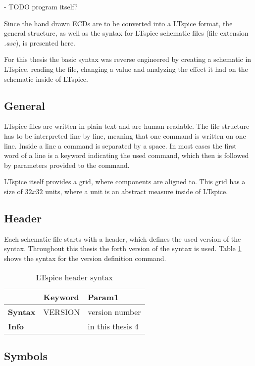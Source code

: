 - TODO program itself?

Since the hand drawn \ac{ECDs} are to be converted into a LTspice format, the general structure, as well as the syntax for LTspice schematic files (file extension \textit{.asc}), is presented here.

For this thesis the basic syntax was reverse engineered by creating a schematic in LTspice, reading the file, changing a value and analyzing the effect it had on the schematic inside of LTspice.

\subsection{General}
LTspice files are written in plain text and are human readable.
The file structure has to be interpreted line by line, meaning that one command is written on one line.
Inside a line a command is separated by a space.
In most cases the first word of a line is a keyword indicating the used command, which then is followed by parameters provided to the command.

LTspice itself provides a grid, where components are aligned to.
This grid has a size of $32x32$ units, where a unit is an abstract measure inside of LTspice.

\subsection{Header}

Each schematic file starts with a header, which defines the used version of the syntax.
Throughout this thesis the forth version of the syntax is used. Table \ref{tab:ltheader_syntax} shows the syntax for the version definition command.

\begin{table}[H]
\begin{center}

\begin{tabular}{l|l|l}
    & \textbf{Keyword} & \textbf{Param1}\\
    \hline
    \textbf{Syntax} & VERSION & version number\\
    \textbf{Info} & & in this thesis 4
\end{tabular}
\caption{LTspice header syntax}
\label{tab:ltheader_syntax}

\end{center}
\end{table}


\subsection{Symbols}

